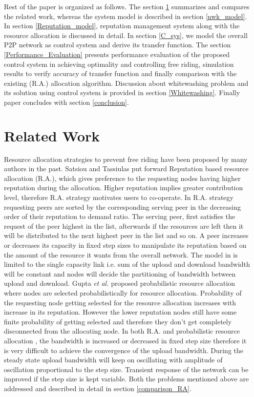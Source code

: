 \documentclass[journal]{IEEEtran}
\begin{document}
Rest of the paper is organized as follows. The section \ref{Related_Work} summarizes and compares the related work, whereas the system model is described in section \ref{nwk_model}. In section \ref{Reputation_model}, reputation management system along with the resource allocation is discussed in detail. In section \ref{C_sys}, we model the overall P2P network as control system and derive its transfer function. The section \ref{Performance_Evaluation} presents performance evaluation of the proposed control system in achieving optimality and controlling free riding, simulation results to verify accuracy of transfer function and finally comparison with the existing (R.A.) \cite{Satsiou} allocation algorithm. Discussion about whitewashing problem and its solution using control system is provided in section \ref{Whitewashing}. Finally paper concludes with section \ref{conclusion}.



\section{Related Work}
\label{Related_Work}
Resource allocation strategies to prevent free riding have been proposed by many authors in the past. Satsiou and Tassiulas \cite{Satsiou} put forward Reputation based resource allocation (R.A.), which gives preference to the requesting nodes having higher reputation during the allocation. Higher reputation implies greater contribution level, therefore R.A. strategy motivates users to co-operate. In R.A. strategy requesting peers are sorted by the corresponding serving peer in the decreasing order of their reputation to demand ratio. The serving peer, first satisfies the request of the peer highest in the list, afterwards if the resources are left then it will be distributed to the next highest peer in the list and so on. A peer increases or decreases its capacity in fixed step sizes to manipulate its reputation based on the amount of the resource it wants from the overall network. The model in \cite{Satsiou} is limited to the single capacity link i.e. sum of the upload and download bandwidth will be constant and nodes will decide the partitioning of bandwidth between upload and download. 
Gupta \emph{et al.} proposed probabilistic resource allocation \cite{probabilistic_allocation} where nodes are selected probabilistically for resource allocation. Probability of the requesting node getting selected for the resource allocation increases with increase in its reputation. However the lower reputation nodes still have some finite probability of getting selected and therefore they don't get completely disconnected from the allocating node.
In both  R.A. \cite{Satsiou} and probabilistic resource allocation \cite{probabilistic_allocation},  the bandwidth is increased or decreased  in fixed step size therefore it is very difficult to achieve the convergence of the upload bandwidth. During the steady state upload bandwidth will keep on oscillating with amplitude of oscillation proportional to the step size. Transient response of the network can be improved if the step size is kept variable. Both the problems mentioned above are addressed and described in detail in section \ref{comparison_RA}.
\end{document}
